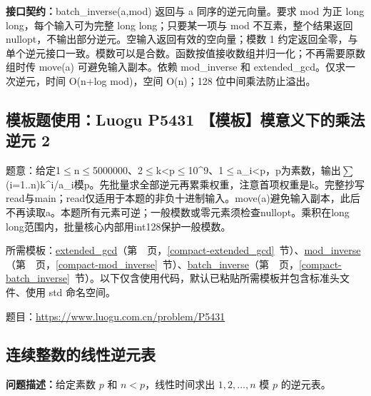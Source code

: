 {\sloppy{}\noindent\textbf{接口契约：}batch\_inverse(a,mod) 返回与 a 同序的逆元向量。要求 mod 为正 long long，每个输入可为完整 long long；只要某一项与 mod 不互素，整个结果返回 nullopt，不输出部分逆元。空输入返回有效的空向量；模数 1 约定返回全零，与单个逆元接口一致。模数可以是合数。函数按值接收数组并归一化；不再需要原数组时传 move(a) 可避免输入副本。依赖 mod\_inverse 和 extended\_gcd。仅求一次逆元，时间 O(n+log mod)，空间 O(n)；128 位中间乘法防止溢出。\par}



\Needspace{570pt}

\subsection*{模板题使用：Luogu P5431 【模板】模意义下的乘法逆元 2}

\label{usage-example-197}

题意：给定1$\le$n$\le$5000000、2$\le$k<p$\le$10\textasciicircum{}9、1$\le$a\_i<p，p为素数，输出$\sum$(i=1..n)k\textasciicircum{}i/a\_i模p。先批量求全部逆元再累乘权重，注意首项权重是k。完整抄写read与main；read仅适用于本题的非负十进制输入。move(a)避免输入副本，此后不再读取a。本题所有元素可逆；一般模数或零元素须检查nullopt。乘积在long long范围内，批量核心内部用int128保护一般模数。

所需模板：\hyperref[compact-extended_gcd]{extended\_\allowbreak{}gcd}（第~\pageref{compact-extended_gcd}~页，\ref{compact-extended_gcd}~节）、\hyperref[compact-mod_inverse]{mod\_\allowbreak{}inverse}（第~\pageref{compact-mod_inverse}~页，\ref{compact-mod_inverse}~节）、\hyperref[compact-batch_inverse]{batch\_\allowbreak{}inverse}（第~\pageref{compact-batch_inverse}~页，\ref{compact-batch_inverse}~节）。以下仅含使用代码，默认已粘贴所需模板并包含标准头文件、使用 std 命名空间。

题目：\url{https://www.luogu.com.cn/problem/P5431}



\Needspace{288pt}

\subsection{连续整数的线性逆元表}\label{compact-inverse_table}

\noindent\textbf{问题描述：}\allowbreak 给定素数 $p$ 和 $n<p$，线性时间求出 $1,2,\dots,n$ 模 $p$ 的逆元表。

